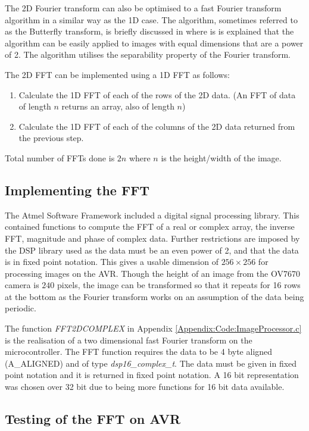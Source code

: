 The 2D Fourier transform can also be optimised to a fast Fourier transform algorithm in a similar way as the 1D case. The algorithm, sometimes referred to as the Butterfly transform, is briefly discussed in \cite{nixon2012feature} where is is explained that the algorithm can be easily applied to images with equal dimensions that are a power of 2. The algorithm utilises the separability property of the Fourier transform. 

The 2D FFT can be implemented using a 1D FFT as follows:
\begin{enumerate}
\item Calculate the 1D FFT of each of the rows of the 2D data. (An FFT of data of length $n$ returns an array, also of length $n$)
\item Calculate the 1D FFT of each of the columns of the 2D data returned from the previous step.
\end{enumerate}
Total number of FFTs done is $2n$ where $n$ is the height/width of the image. 
\subsection{Implementing the FFT}
The Atmel Software Framework \citep{Atmel:ASF} included a digital signal processing library. This contained functions to compute the FFT of a real or complex array, the inverse FFT, magnitude and phase of complex data. Further restrictions are imposed by the DSP library used as the data must be an even power of 2, and that the data is in fixed point notation. This gives a usable dimension of $256 \times 256$ for processing images on the AVR. Though the height of an image from the OV7670 camera is $240$ pixels, the image can be transformed so that it repeats for 16 rows at the bottom as the Fourier transform works on an assumption of the data being periodic.

The function \textit{FFT2DCOMPLEX} in Appendix \ref{Appendix:Code:ImageProcessor.c} is the realisation of a two dimensional fast Fourier transform on the microcontroller. The FFT function requires the data to be 4 byte aligned (A\_ALIGNED) and of type \textit{dsp16\_complex\_t}. The data must be given in fixed point notation and it is returned in fixed point notation. A 16 bit representation was chosen over 32 bit due to being more functions for 16 bit data available. 


\subsection{Testing of the FFT on AVR}
